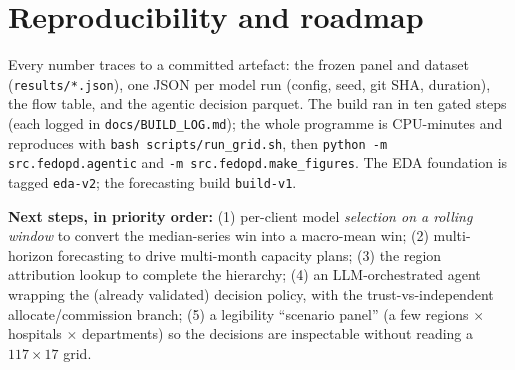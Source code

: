 \documentclass[11pt,a4paper]{article}
\begin{document}
\section{Reproducibility and roadmap}\label{sec:repro}
Every number traces to a committed artefact: the frozen panel and dataset (\texttt{results/*.json}),
one JSON per model run (config, seed, git SHA, duration), the flow table, and the agentic decision
parquet. The build ran in ten gated steps (each logged in \texttt{docs/BUILD\_LOG.md}); the whole
programme is CPU-minutes and reproduces with \texttt{bash scripts/run\_grid.sh}, then
\texttt{python -m src.fedopd.agentic} and \texttt{-m src.fedopd.make\_figures}. The EDA foundation is
tagged \texttt{eda-v2}; the forecasting build \texttt{build-v1}.

\textbf{Next steps, in priority order:} (1) per-client model \emph{selection on a rolling window} to
convert the median-series win into a macro-mean win; (2) multi-horizon forecasting to drive
multi-month capacity plans; (3) the region attribution lookup to complete the hierarchy; (4) an
LLM-orchestrated agent wrapping the (already validated) decision policy, with the trust-vs-independent
allocate/commission branch; (5) a legibility ``scenario panel'' (a few regions $\times$ hospitals
$\times$ departments) so the decisions are inspectable without reading a $117\times17$ grid.
\end{document}
